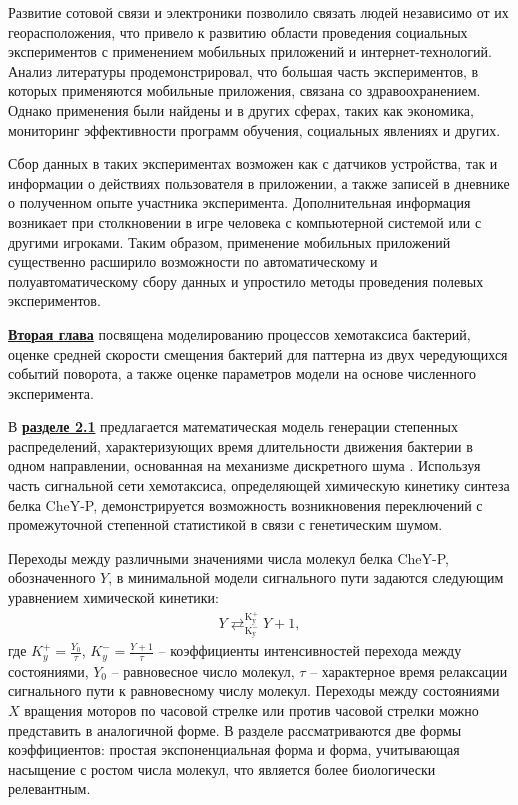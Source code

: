 Развитие сотовой связи и электроники позволило связать людей независимо от их георасположения, что привело к развитию области проведения социальных экспериментов с применением мобильных приложений и интернет-технологий. Анализ литературы продемонстрировал, что большая часть экспериментов, в которых применяются мобильные приложения, связана со здравоохранением. Однако применения были найдены и в других сферах, таких как экономика, мониторинг эффективности программ обучения, социальных явлениях и других. 

Сбор данных в таких экспериментах возможен как с датчиков устройства, так и информации о действиях пользователя в приложении, а также записей в дневнике о полученном опыте участника эксперимента. Дополнительная информация возникает при столкновении в игре человека с компьютерной системой или с другими игроками. Таким образом, применение мобильных приложений существенно расширило возможности по автоматическому и полуавтоматическому сбору данных и упростило методы проведения полевых экспериментов.

\underline{\textbf{Вторая глава}} посвящена моделированию процессов хемотаксиса бактерий, оценке средней скорости смещения бактерий для паттерна из двух чередующихся событий поворота, а также оценке параметров модели на основе численного эксперимента.

В \underline{\textbf{разделе 2.1}} предлагается математическая модель генерации степенных распределений, характеризующих время длительности движения бактерии в одном направлении, основанная на механизме дискретного шума \cite{bib1,confbib5}. Используя часть сигнальной сети хемотаксиса, определяющей химическую кинетику синтеза белка CheY-P, демонстрируется возможность возникновения переключений с промежуточной степенной статистикой в связи с генетическим шумом.

Переходы между различными значениями числа молекул белка CheY-P, обозначенного $Y$, в минимальной модели сигнального пути задаются следующим уравнением химической кинетики:
\begin{equation}
    \begin{aligned}
        Y \mathrel{\mathop{\rightleftarrows}^{\mathrm{K_{y}^{+}}}_{\mathrm{K_{y}^{-}}}} Y + 1,
    \label{eq:chem}
    \end{aligned}
\end{equation}
где $K_{y}^{+}=\frac{Y_0}{\tau}$, $K_{y}^{-}=\frac{Y+1}{\tau}$ -- коэффициенты интенсивностей перехода между состояниями, $Y_0$ -- равновесное число молекул, $\tau$ -- характерное время релаксации сигнального пути к равновесному числу молекул. Переходы между состояниями $X$ вращения моторов по часовой стрелке или против часовой стрелки можно представить в аналогичной форме. В разделе рассматриваются две формы коэффициентов: простая экспоненциальная форма и форма, учитывающая насыщение с ростом числа молекул, что является более биологически релевантным.

